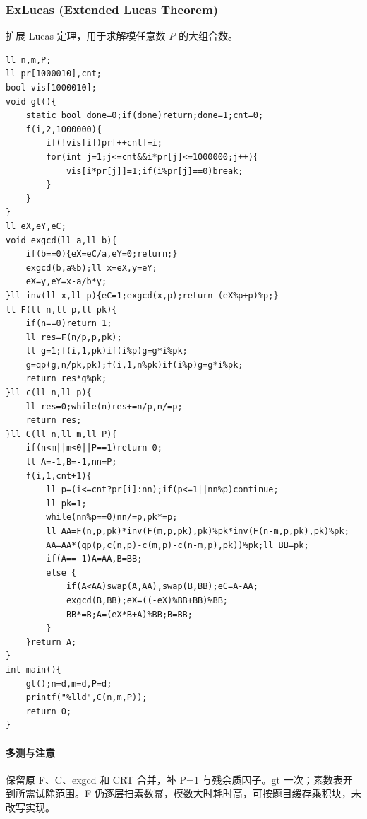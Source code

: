 \subsubsection{ExLucas (Extended Lucas Theorem)}
扩展 Lucas 定理，用于求解模任意数 $P$ 的大组合数。
\begin{lstlisting}
ll n,m,P;
ll pr[1000010],cnt;
bool vis[1000010];
void gt(){
    static bool done=0;if(done)return;done=1;cnt=0;
	f(i,2,1000000){
		if(!vis[i])pr[++cnt]=i;
		for(int j=1;j<=cnt&&i*pr[j]<=1000000;j++){
			vis[i*pr[j]]=1;if(i%pr[j]==0)break;
		}
	}
}
ll eX,eY,eC;
void exgcd(ll a,ll b){
	if(b==0){eX=eC/a,eY=0;return;}
	exgcd(b,a%b);ll x=eX,y=eY;
	eX=y,eY=x-a/b*y;
}ll inv(ll x,ll p){eC=1;exgcd(x,p);return (eX%p+p)%p;}
ll F(ll n,ll p,ll pk){
	if(n==0)return 1;
	ll res=F(n/p,p,pk);
	ll g=1;f(i,1,pk)if(i%p)g=g*i%pk;
	g=qp(g,n/pk,pk);f(i,1,n%pk)if(i%p)g=g*i%pk;
	return res*g%pk;
}ll c(ll n,ll p){
	ll res=0;while(n)res+=n/p,n/=p;
	return res;
}ll C(ll n,ll m,ll P){
	if(n<m||m<0||P==1)return 0;
	ll A=-1,B=-1,nn=P;
	f(i,1,cnt+1){
        ll p=(i<=cnt?pr[i]:nn);if(p<=1||nn%p)continue;
        ll pk=1;
		while(nn%p==0)nn/=p,pk*=p;
		ll AA=F(n,p,pk)*inv(F(m,p,pk),pk)%pk*inv(F(n-m,p,pk),pk)%pk;
		AA=AA*(qp(p,c(n,p)-c(m,p)-c(n-m,p),pk))%pk;ll BB=pk;
		if(A==-1)A=AA,B=BB;
		else {
			if(A<AA)swap(A,AA),swap(B,BB);eC=A-AA;
			exgcd(B,BB);eX=((-eX)%BB+BB)%BB;
			BB*=B;A=(eX*B+A)%BB;B=BB;
		}
	}return A;
}
int main(){
	gt();n=d,m=d,P=d;
	printf("%lld",C(n,m,P));
	return 0;
}
\end{lstlisting}

\paragraph{多测与注意} 保留原 F、C、exgcd 和 CRT 合并，补 P=1 与残余质因子。gt 一次；素数表开到所需试除范围。F 仍逐层扫素数幂，模数大时耗时高，可按题目缓存乘积块，未改写实现。

